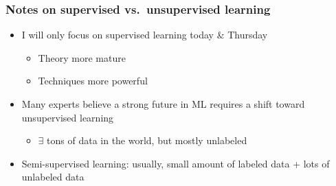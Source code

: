 \begin{frame}
    \frametitle{Notes on supervised vs.\ unsupervised learning}

    \begin{itemize}
        \item I will only focus on supervised learning today \& Thursday
        \begin{itemize}
            \item Theory more mature
            \item Techniques more powerful
        \end{itemize}
        \item Many experts believe a strong future in ML requires a shift toward unsupervised learning
        \begin{itemize}
            \item $\exists$ tons of data in the world, but mostly unlabeled
        \end{itemize}
        \item Semi-supervised learning: usually, small amount of labeled data + lots of unlabeled data
    \end{itemize}
\end{frame}

